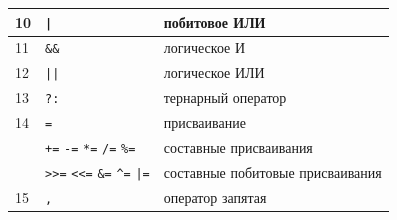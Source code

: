 \documentclass[10pt]{article}
\begin{document}
\begin{center}
{\begin{tabular}{ l | l | l}
 10				    & \texttt{|}  		 				& побитовое ИЛИ \\ \hline  
 11				    & \texttt{\&\&}  		 			& логическое И \\ \hline  
 12				    & \texttt{||}  		 				& логическое ИЛИ \\ \hline  
 13				    & \texttt{?:}  		 				& тернарный оператор \\ \hline 
 14				    & \texttt{=}  		 				& присваивание \\
  				    & \texttt{+=} \texttt{-=} \texttt{*=} \texttt{/=} \texttt{\%=}  & составные присваивания \\
  				    & \texttt{>{}>=} \texttt{<{}<=} \texttt{\&=} \texttt{\^{}=} \texttt{|=}  & составные побитовые присваивания \\\hline  
 15				    & \texttt{,}  		 				& оператор запятая
\end{tabular} 
}
\end{center}
\end{document}
